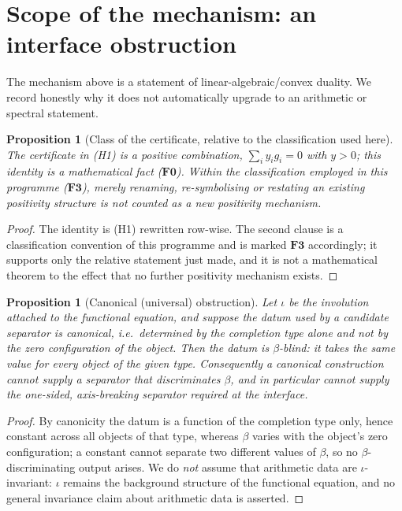 \documentclass[11pt]{article}
\newtheorem{proposition}[theorem]{Proposition}
\theoremstyle{definition}
\begin{document}
\section{Scope of the mechanism: an interface obstruction}\label{sec:scope}

The mechanism above is a statement of linear-algebraic/convex duality. We record honestly why it does
not automatically upgrade to an arithmetic or spectral statement.

\begin{proposition}[Class of the certificate, relative to the classification used here]\label{prop:class}
The certificate in \textup{(H1)} is a positive combination, $\sum_iy_ig_i=0$ with $y>0$; this identity is a
mathematical fact ($\mathbf{F0}$). Within the classification employed in this programme ($\mathbf{F3}$), merely
renaming, re-symbolising or restating an existing positivity structure is not counted as a new positivity
mechanism.
\end{proposition}
\begin{proof}
The identity is \textup{(H1)} rewritten row-wise. The second clause is a classification convention of this
programme and is marked $\mathbf{F3}$ accordingly; it supports only the relative statement just made, and it is
not a mathematical theorem to the effect that no further positivity mechanism exists.
\end{proof}

\begin{proposition}[Canonical (universal) obstruction]\label{prop:iota}
Let $\iota$ be the involution attached to the functional equation, and suppose the datum used by a
candidate separator is \emph{canonical}, i.e.\ determined by the completion type alone and not by the zero
configuration of the object. Then the datum is $\beta$-blind: it takes the same value for every object of
the given type. Consequently a canonical construction cannot supply a separator that discriminates $\beta$,
and in particular cannot supply the one-sided, axis-breaking separator required at the interface.
\end{proposition}
\begin{proof}
By canonicity the datum is a function of the completion type only, hence constant across all objects of that
type, whereas $\beta$ varies with the object's zero configuration; a constant cannot separate two different
values of $\beta$, so no $\beta$-discriminating output arises. We do \emph{not} assume that arithmetic data
are $\iota$-invariant: $\iota$ remains the background structure of the functional equation, and no general
invariance claim about arithmetic data is asserted.
\end{proof}
\end{document}
